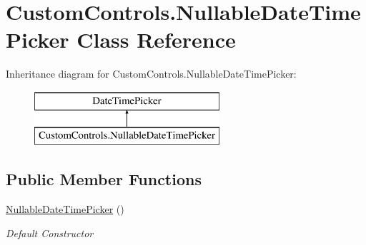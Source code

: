 \hypertarget{class_custom_controls_1_1_nullable_date_time_picker}{}\section{Custom\+Controls.\+Nullable\+Date\+Time\+Picker Class Reference}
\label{class_custom_controls_1_1_nullable_date_time_picker}
Inheritance diagram for Custom\+Controls.\+Nullable\+Date\+Time\+Picker\+:\begin{figure}[H]
\begin{center}
\leavevmode
\includegraphics[height=2.000000cm]{class_custom_controls_1_1_nullable_date_time_picker}
\end{center}
\end{figure}
\subsection*{Public Member Functions}
\begin{DoxyCompactItemize}
\item 
\mbox{\hyperlink{class_custom_controls_1_1_nullable_date_time_picker_ae34b0db983f9509c0442e730a8baa417}{Nullable\+Date\+Time\+Picker}} ()
\begin{DoxyCompactList}\small\item\em Default Constructor \end{DoxyCompactList}\end{DoxyCompactItemize}
